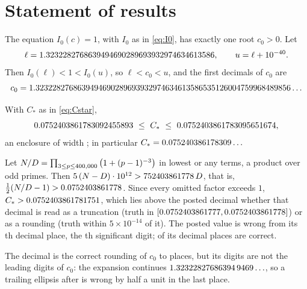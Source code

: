 \documentclass[11pt]{article}
\theoremstyle{definition}\newtheorem{observation}{Observation}
\newcommand{\Cstar}{C_{*}}
\begin{document}
\section{Statement of results}

\begin{theorem}\label{thm:c0}
The equation $I_0(c)=1$, with $I_0$ as in \eqref{eq:I0}, has exactly one root $c_0>0$. Let
\[
\ell=1.3232282768639494690289693932974634613586,\qquad u=\ell+10^{-40}.
\]
Then $I_0(\ell)<1<I_0(u)$, so $\ell<c_0<u$, and the first \CzeroDecimals{} decimals of $c_0$ are
\[
c_0=1.3232282768639494690289693932974634613586535126004759968489856\ldots
\]
\end{theorem}

\begin{theorem}\label{thm:cstar}
With $\Cstar$ as in \eqref{eq:Cstar},
\[
\CstarLo\ \le\ \Cstar\ \le\ \CstarHi ,
\]
an enclosure of width \CstarWidth; in particular $\Cstar=\CstarDigits\ldots$
\end{theorem}

\begin{proposition}[the posted $\Cstar$ is refuted]\label{prop:cstar-refuted}
Let $N/D=\prod_{3\le p\le400{,}000}\big(1+(p-1)^{-3}\big)$ in lowest or any terms, a product over \RefPrimes{} odd primes. Then $5\,(N-D)\cdot 10^{12} > 752403861778\,D$, that is, $\tfrac12(N/D-1)>0.0752403861778$. Since every omitted factor exceeds $1$, $\Cstar>\RefLowerBound$, which lies above the posted decimal \CstarPublished{} whether that decimal is read as a truncation (truth in $[0.0752403861777,0.0752403861778]$) or as a rounding (truth within $5\times10^{-14}$ of it). The posted value is wrong from its \CstarDiffDecimal{}th decimal place, the \CstarDiffSignificant{}th significant digit; \CstarCorrectDecimals{} of its \CstarPubDecimals{} decimal places are correct.
\end{proposition}

\begin{proposition}\label{prop:c0-rounded}
The decimal \CzeroPublished{} is the correct rounding of $c_0$ to \CzeroPubDecimals{} places, but its digits are not the leading digits of $c_0$: the expansion continues $1.32322827686394\,9469\ldots$, so a trailing ellipsis after \CzeroPublished{} is wrong by half a unit in the last place.
\end{proposition}
\end{document}
